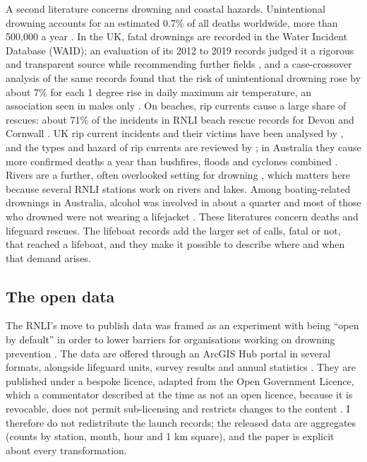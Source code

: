 \documentclass[11pt,a4paper]{article}
\begin{document}
A second literature concerns drowning and coastal hazards. Unintentional drowning accounts for an estimated 0.7\% of all deaths worldwide, more than 500,000 a year \citep{szpilman2012}. In the UK, fatal drownings are recorded in the Water Incident Database (WAID); an evaluation of its 2012 to 2019 records judged it a rigorous and transparent source while recommending further fields \citep{hills2021}, and a case-crossover analysis of the same records found that the risk of unintentional drowning rose by about 7\% for each 1 degree rise in daily maximum air temperature, an association seen in males only \citep{hills2024}. On beaches, rip currents cause a large share of rescues: about 71\% of the incidents in RNLI beach rescue records for Devon and Cornwall \citep{scott2007}. UK rip current incidents and their victims have been analysed by \citet{woodward2013}, and the types and hazard of rip currents are reviewed by \citet{castelle2016}; in Australia they cause more confirmed deaths a year than bushfires, floods and cyclones combined \citep{brander2013}. Rivers are a further, often overlooked setting for drowning \citep{peden2016}, which matters here because several RNLI stations work on rivers and lakes. Among boating-related drownings in Australia, alcohol was involved in about a quarter and most of those who drowned were not wearing a lifejacket \citep{willcoxpidgeon2019}. These literatures concern deaths and lifeguard rescues. The lifeboat records add the larger set of calls, fatal or not, that reached a lifeboat, and they make it possible to describe where and when that demand arises.

\subsection{The open data}
The RNLI's move to publish data was framed as an experiment with being ``open by default'' in order to lower barriers for organisations working on drowning prevention \citep{roberts2018}. The data are offered through an ArcGIS Hub portal in several formats, alongside lifeguard units, survey results and annual statistics \citep{rnliresearch}. They are published under a bespoke licence, adapted from the Open Government Licence, which a commentator described at the time as not an open licence, because it is revocable, does not permit sub-licensing and restricts changes to the content \citep{boswarva2018}. I therefore do not redistribute the launch records; the released data are aggregates (counts by station, month, hour and 1 km square), and the paper is explicit about every transformation.
\end{document}
